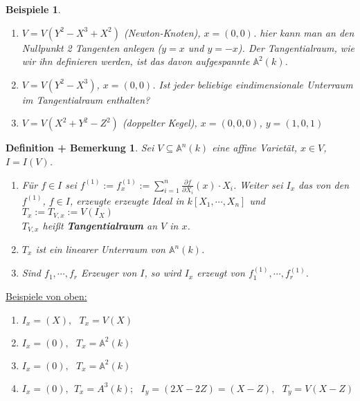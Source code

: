 \documentclass[a4paper,12pt]{report}
\theoremstyle{break}
\newtheorem{DefBem}[Def]{Definition + Bemerkung}
\theoremstyle{nonumberbreak}
\newtheorem{nnBsp}{Beispiele}
\theoremstyle{nonumberplain}
\newcommand{\emp}[1]{\textbf{\emph{#1}}}
\newcommand{\begriff}[1]{{\index{#1}}\emp{#1}}
\begin{document}
\begin{nnBsp}
\begin{enumerate}
\begin{tikzpicture}
    \end{tikzpicture}
\item[2.)] $V=V(Y^2-X^3+X^2)$ (Newton-Knoten), $x=(0,0)$.
hier kann man an den Nullpunkt 2 Tangenten anlegen ($y=x$ und $y=-x$). Der Tangentialraum, wie wir ihn definieren werden, ist das davon aufgespannte $\mathbb{A}^2(k)$.
\item[3.)] $V=V(Y^2-X^3)$, $x=(0,0)$. Ist jeder beliebige eindimensionale Unterraum im Tangentialraum enthalten?
\item[4.)] $V=V(X^2+Y^2-Z^2)$ (doppelter Kegel), $x=(0,0,0)$, $y=(1,0,1)$
\end{enumerate}
\end{nnBsp}

\begin{DefBem}
\label{defbem:16.1}
Sei $V\subseteq \mathbb{A}^n(k)$ eine affine Varietät, $x\in V$, $I=I(V)$.
\begin{enumerate}
\item Für $f\in I$ sei $f^{(1)}:= f^{(1)}_x := \sum_{i=1}^n \frac{\partial f}{\partial X_i}(x)\cdot X_i$. Weiter sei $I_x$ das von den $f^{(1)}$, $f\in I$, erzeugte erzeugte Ideal in $k[X_1,\cdots ,X_n]$ und $T_x:=T_{V,x}:=V(I_X)$\\
$T_{V,x}$ heißt \begriff{Tangentialraum} an $V$ in $x$.
\item $T_x$ ist ein linearer Unterraum von $\mathbb{A}^n(k)$.
\item Sind $f_1,\cdots , f_r$ Erzeuger von $I$, so wird $I_x$ erzeugt von $f_1^{(1)},\cdots, f_r^{(1)}$.
\end{enumerate}
\end{DefBem}
\underline{Beispiele von oben:}
\begin{enumerate}
\item $I_x=(X),~~~T_x=V(X)$
\item $I_x=(0),~~~T_x=\mathbb{A}^2(k)$
\item $I_x=(0),~~~T_x=\mathbb{A}^2(k)$
\item $I_x=(0),~~T_x={A}^3(k);~~~I_y=(2X-2Z)=(X-Z),~~~T_y=V(X-Z)$
\end{enumerate}
\end{document}
